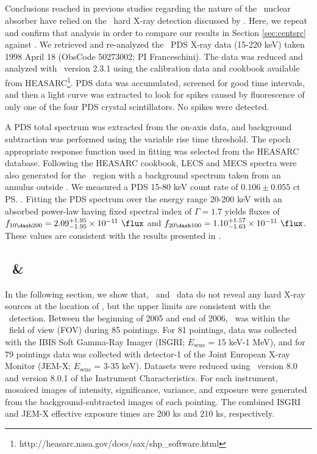 \documentclass[useAMS,usenatbib]{mn2e}
\begin{document}
\subsection{\bepposax}
\label{sec:beppo}

Conclusions reached in previous studies regarding the nature of the
\irs\ nuclear absorber have relied on the \bepposax\ hard X-ray
detection discussed by \citet{2000A&A...353..910F}. Here, we repeat
and confirm that analysis in order to compare our results in Section
\ref{sec:centsrc} against \citet{2000A&A...353..910F}. We retrieved
and re-analyzed the \bepposax\ PDS X-ray data (15-220 keV) taken 1998
April 18 (ObsCode 50273002; PI Franceschini). The data was reduced and
analyzed with \saxdas\ version 2.3.1 using the calibration data and
cookbook available from
HEASARC\footnote{http://heasarc.nasa.gov/docs/sax/shp\_software.html}. PDS
data was accumulated, screened for good time intervals, and then a
light curve was extracted to look for spikes caused by fluorescence of
only one of the four PDS crystal scintillators. No spikes were
detected.

A PDS total spectrum was extracted from the on-axis data, and
background subtraction was performed using the variable rise time
threshold. The epoch appropriate response function used in fitting was
selected from the HEASARC database. Following the HEASARC cookbook,
LECS and MECS spectra were also generated for the \rf\ region with a
background spectrum taken from an annulus outside \rf. We measured a
PDS 15-80 keV count rate of $0.106 \pm 0.055$ ct \ps. Fitting the PDS
spectrum over the energy range 20-200 keV with an absorbed power-law
having fixed spectral index of $\Gamma = 1.7$ yields fluxes of $f_{10
  \dash 200} = 2.09^{+1.95}_{-1.95} \times 10^{-11} ~\flux$ and $f_{20
  \dash 100} = 1.10^{+1.57}_{-1.63} \times 10^{-11} ~\flux$. These
values are consistent with the results presented in
\citet{2000A&A...353..910F}.

\subsection{\integral\ \& \swift}
\label{sec:integral}

In the following section, we show that, \integral\ and \swift\ data do
not reveal any hard X-ray sources at the location of \irs, but the
upper limits are consistent with the \bepposax\ detection. Between the
beginning of 2005 and end of 2006, \irs\ was within the
\integral\ field of view (FOV) during 85 pointings. For 81 pointings,
data was collected with the IBIS Soft Gamma-Ray Imager (ISGRI;
$E_{\mathrm{sens}}$ = 15 keV-1 MeV), and for 79 pointings data was
collected with detector-1 of the Joint European X-ray Monitor (JEM-X;
$E_{\mathrm{sens}}$ = 3-35 keV). Datasets were reduced using
\osa\ version 8.0 and version 8.0.1 of the Instrument
Characteristics. For each instrument, mosaiced images of intensity,
significance, variance, and exposure were generated from the
background-subtracted images of each pointing. The combined ISGRI and
JEM-X effective exposure times are 200 ks and 210 ks, respectively.
\end{document}
